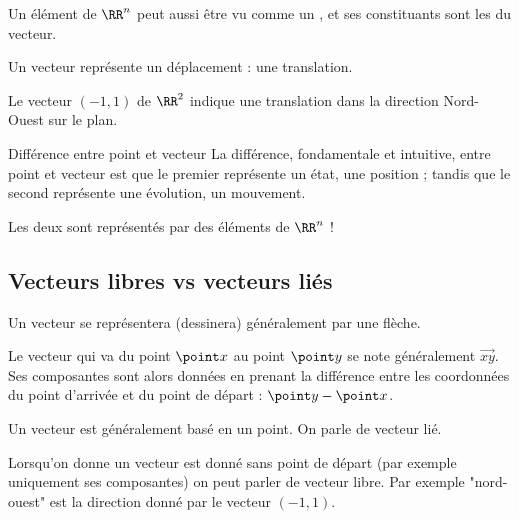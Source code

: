 \documentclass[french,xcolor=svgnames]{beamer}
\begin{document}
\begin{frame}%
  \begin{definition}
    Un élément de \(\RR^{n}\) peut aussi être vu comme un ,\pause{} et ses constituants sont les  du vecteur.
  \end{definition}\pause

  \begin{remark}
    Un vecteur représente un déplacement : une translation.
  \end{remark}\pause{}

  \begin{example}
    Le vecteur \((-1,1)\) de \(\RR^{2}\)\pause{} indique une translation dans la direction \og Nord-Ouest\fg{} sur le plan.
  \end{example}
\end{frame}


\begin{frame}%
  \begin{block}{Différence entre point et vecteur}
    La différence, fondamentale et intuitive, entre point et vecteur\pause{} est que le premier représente un état, une position\pause{} ; tandis que le second\pause{} représente une évolution, un mouvement.
  \end{block}

  \begin{remark}\pause{}
    Les deux sont représentés par des éléments de \(\RR^n\) !
  \end{remark}
\end{frame}

\subsection{Vecteurs libres vs vecteurs liés}
\begin{frame}%
  Un vecteur se représentera (dessinera) généralement par une flèche.\pause{}

  Le vecteur qui va du point $\point x$ au point $\point y$ se note généralement $\vec{xy}$.\pause{} Ses composantes sont alors données\pause{} en prenant la différence entre les coordonnées du point d'arrivée et du point de départ\pause{} : $\point y - \point x$.\pause{}

  Un vecteur est généralement basé en un point.\pause{} On parle de vecteur lié.\pause{}

  Lorsqu'on donne un vecteur est donné sans point de départ\pause{} (par exemple uniquement ses composantes)\pause{} on peut parler de vecteur libre\pause{}. Par exemple "nord-ouest" est la direction donné par le vecteur $(-1,1)$.
\end{frame}
\end{document}
